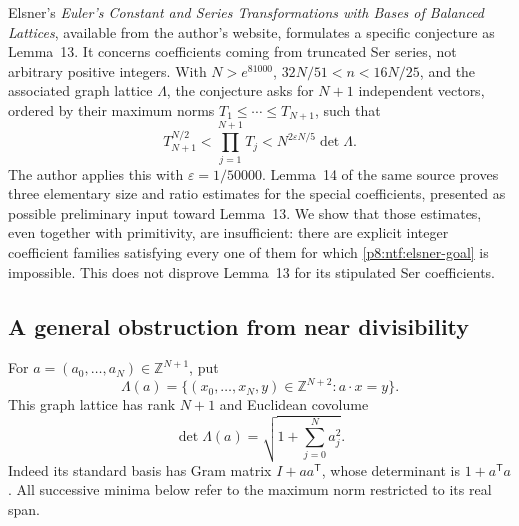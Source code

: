 \documentclass[11pt,a4paper]{article}
\theoremstyle{definition}
\theoremstyle{remark}
\numberwithin{equation}{section}
\begin{document}
Elsner's \emph{Euler's Constant and Series Transformations with Bases of
Balanced Lattices}, available from the author's website, formulates a
specific conjecture as Lemma~13.  It concerns coefficients coming from
truncated Ser series, not arbitrary positive integers.  With $N>e^{81000}$,
$32N/51<n<16N/25$, and the associated graph lattice $\Lambda$, the
conjecture asks for $N+1$ independent vectors, ordered by their maximum
norms $T_1\leq\cdots\leq T_{N+1}$, such that
\begin{equation}\label{p8:ntf:elsner-goal}
 T_{N+1}^{N/2}<\prod_{j=1}^{N+1}T_j
              <N^{2\varepsilon N/5}\det\Lambda.
\end{equation}
The author applies this with $\varepsilon=1/50000$.  Lemma~14 of the
same source proves three elementary size and ratio estimates for the
special coefficients, presented as possible preliminary input toward
Lemma~13.  We show that those estimates, even together with primitivity,
are insufficient: there are explicit integer coefficient families
satisfying every one of them for which \eqref{p8:ntf:elsner-goal} is impossible.
This does not disprove Lemma~13 for its stipulated Ser coefficients.

\subsection{A general obstruction from near divisibility}

For $a=(a_0,\ldots,a_N)\in\mathbb Z^{N+1}$, put
\[
 \Lambda(a)=\{(x_0,\ldots,x_N,y)\in\mathbb Z^{N+2}:
                  a\cdot x=y\}.
\]
This graph lattice has rank $N+1$ and Euclidean covolume
\begin{equation}\label{p8:ntf:determinant}
 \det\Lambda(a)=\sqrt{1+\sum_{j=0}^N a_j^2}.
\end{equation}
Indeed its standard basis has Gram matrix $I+aa^{\mathsf T}$,
whose determinant is $1+a^{\mathsf T}a$.  All successive minima below
refer to the maximum norm restricted to its real span.
\end{document}
